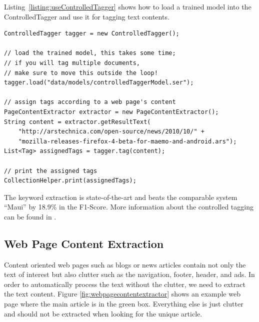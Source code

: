 Listing~\ref{listing:useControlledTagger} shows how to load a trained model into the ControlledTagger and use it for tagging text contents.

\begin{codelisting}
\begin{lstlisting}[label=listing:useControlledTagger,caption=Using the controlled tagger.,frame=tb]
ControlledTagger tagger = new ControlledTagger();

// load the trained model, this takes some time;
// if you will tag multiple documents, 
// make sure to move this outside the loop!
tagger.load("data/models/controlledTaggerModel.ser");
        
// assign tags according to a web page's content
PageContentExtractor extractor = new PageContentExtractor();
String content = extractor.getResultText(
	"http://arstechnica.com/open-source/news/2010/10/" + 
	"mozilla-releases-firefox-4-beta-for-maemo-and-android.ars");
List<Tag> assignedTags = tagger.tag(content);
        
// print the assigned tags
CollectionHelper.print(assignedTags);
\end{lstlisting}
\end{codelisting}

The keyword extraction is state-of-the-art and beats the comparable system ``Maui''\cite{medelyan2009human} by 18.9\% in the F1-Score.
More information about the controlled tagging can be found in \cite{katz2010diploma}.

\subsection{Web Page Content Extraction}
Content oriented web pages such as blogs or news articles contain not only the text of interest but also clutter such as the navigation, footer, header, and ads. In order to automatically process the text without the clutter, we need to extract the text content. Figure \ref{fig:webpagecontentextractor} shows an example web page where the main article is in the green box. Everything else is just clutter and should not be extracted when looking for the unique article.

